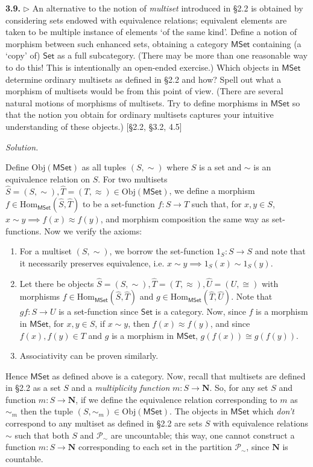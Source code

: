 \documentclass[14pt,parskip=full]{scrartcl}
\newcommand{\exercise}[3]{
\noindent
\textbf{#1.} #2

\noindent
\textit{Solution.}{\let\tpar\par \let\par\relax #3}
}
\newcommand{\Obj}{\mathrm{Obj}}
\newcommand{\Hom}{\mathrm{Hom}}
\begin{document}
{\def \Set {\mathsf{Set}} \def \MSet {\mathsf{MSet}}
\exercise
{3.9}{$\rhd$ An alternative to the notion of \textit{multiset} introduced in
\S2.2 is obtained by considering sets endowed with equivalence relations;
equivalent elements are taken to be multiple instance of elements `of the same
kind'. Define a notion of morphism between such enhanced sets, obtaining a
category $\MSet$ containing (a `copy' of) $\Set$ as a full subcategory. (There
may be more than one reasonable way to do this! This is intentionally an
open-ended exercise.) Which objects in $\MSet$ determine ordinary multisets as
defined in \S2.2 and how? Spell out what a morphism of multisets would be from
this point of view. (There are several natural motions of morphisms of
multisets. Try to define morphisms in $\MSet$ so that the notion you obtain for
ordinary multisets captures your intuitive understanding of these objects.)
[\S2.2, \S3.2, 4.5]}{

Define $\Obj(\MSet)$ as all tuples $(S, \sim)$ where $S$ is a set and $\sim$ is
an equivalence relation on $S$. For two multisets $\hat{S} = (S,\sim), \hat{T} =
(T,\approx) \in \Obj(\MSet)$, we define a morphism
$f\in\Hom_\MSet(\hat{S},\hat{T})$ to be a set-function $f:S\to T$ such that, for
$x,y\in S$, $x\sim y\implies f(x)\approx f(y)$, and morphism composition the
same way as set-functions. Now we verify the axioms:

\tpar
\begin{enumerate}
\item For a multiset $(S,\sim)$, we borrow the set-function $1_S:S\to S$ and
note that it necessarily preserves equivalence, i.e. $x\sim y\implies 1_S(x)\sim
1_S(y)$.
\item Let there be objects $\hat{S}=(S,\sim), \hat{T}=(T,\approx),
\hat{U}=(U,\cong)$ with morphisms $f\in\Hom_\MSet(\hat{S},\hat{T})$ and
$g\in\Hom_\MSet(\hat{T},\hat{U})$. Note that $gf:S\to U$ is a set-function since
$\Set$ is a category. Now, since $f$ is a morphism in $\MSet$, for
$x,y\in S$, if $x\sim y$, then $f(x)\approx f(y)$, and since $f(x),f(y)\in T$
and $g$ is a morphism in $\MSet$, $g(f(x))\cong g(f(y))$.
\item Associativity can be proven similarly.
\end{enumerate}

Hence $\MSet$ as defined above is a category. Now, recall that multisets are
defined in \S2.2 as a set $S$ and a \textit{multiplicity function}
$m:S\to\mathbf{N}$. So, for any set $S$ and function $m:S\to\mathbf{N}$, if we
define the equivalence relation corresponding to $m$ as $\sim_m$ then the
tuple $(S,\sim_m)\in\Obj(\MSet)$. The objects in $\MSet$ which
\textit{don't} correspond to any multiset as defined in \S2.2 are sets $S$ with
equivalence relations $\sim$ such that both $S$ and $\mathscr{P}_\sim$ are
uncountable; this way, one cannot construct a function $m:S\to\mathbf{N}$
corresponding to each set in the partition $\mathscr{P}_\sim$, since
$\mathbf{N}$ is countable.

}}
\end{document}
